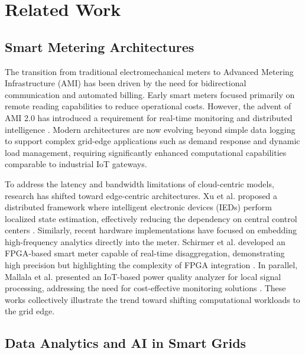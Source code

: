 \documentclass[fleqn,10pt]{wlscirep}
\begin{document}
\section{Related Work}
\label{sec:related_work}

\subsection{Smart Metering Architectures}

The transition from traditional electromechanical meters to Advanced Metering Infrastructure (AMI) has been driven by the need for bidirectional communication and automated billing. Early smart meters focused primarily on remote reading capabilities to reduce operational costs. However, the advent of AMI 2.0 has introduced a requirement for real-time monitoring and distributed intelligence \cite{ami2.0}. Modern architectures are now evolving beyond simple data logging to support complex grid-edge applications such as demand response and dynamic load management, requiring significantly enhanced computational capabilities comparable to industrial IoT gateways.

To address the latency and bandwidth limitations of cloud-centric models, research has shifted toward edge-centric architectures. Xu et al. proposed a distributed framework where intelligent electronic devices (IEDs) perform localized state estimation, effectively reducing the dependency on central control centers \cite{Xu2024}. Similarly, recent hardware implementations have focused on embedding high-frequency analytics directly into the meter. Schirmer et al. developed an FPGA-based smart meter capable of real-time disaggregation, demonstrating high precision but highlighting the complexity of FPGA integration \cite{Schirmer2025}. In parallel, Mallala et al. presented an IoT-based power quality analyzer for local signal processing, addressing the need for cost-effective monitoring solutions \cite{Mallala2025}. These works collectively illustrate the trend toward shifting computational workloads to the grid edge.

\subsection{Data Analytics and AI in Smart Grids}
\end{document}
